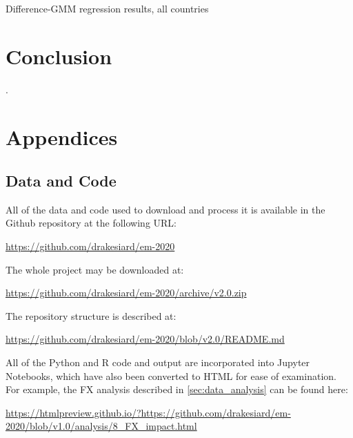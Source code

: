 \documentclass[12pt,a4paper]{article}
\begin{document}
\renewcommand{\arraystretch}{3}
\begin{table}[htbp]
\centering

\caption{Difference-GMM regression results, all countries}
\label{tab:diffgmm_coeff_all}
\end{table}
\renewcommand{\arraystretch}{1}





\section{Conclusion}\label{sec:conclusion}

\clearpage

\appendix

\renewcommand{\refname}{\section{References}\label{sec:references}}.


\clearpage

\section{Appendices}

\subsection{Data and Code}\label{sec:data_and_code}

All of the data and code used to download and process it is available in the Github repository at the following URL:

\url{https://github.com/drakesiard/em-2020}

\noindent
The whole project may be downloaded at:

\url{https://github.com/drakesiard/em-2020/archive/v2.0.zip}

\noindent
The repository structure is described at:

\url{https://github.com/drakesiard/em-2020/blob/v2.0/README.md}

\noindent
All of the Python and R code and output are incorporated into Jupyter Notebooks, which have also been converted to HTML for ease of examination. For example, the FX analysis described in \cref{sec:data_analysis} can be found here:

\begin{adjustbox}{max width=\textwidth}
\url{https://htmlpreview.github.io/?https://github.com/drakesiard/em-2020/blob/v1.0/analysis/8_FX_impact.html}
\end{adjustbox}
\end{document}
